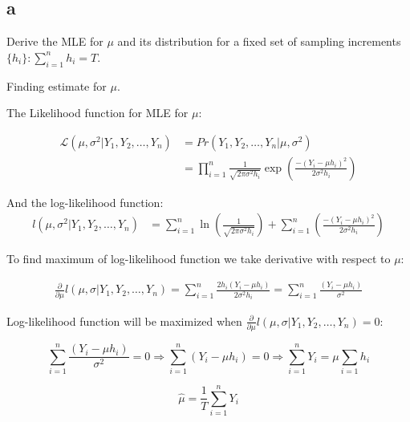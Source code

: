 \subsection{a} Derive the MLE for $\mu$ and its distribution for a fixed set of sampling increments $\{h_i\}:\sum_{i=1}^nh_i=T$.

\begin{solution} Finding estimate for $\mu$.

The Likelihood function for MLE for $\mu$:

\begin{equation}
\begin{aligned}
\mathcal{L}\left(\mu,\sigma^2|Y_1, Y_2, \ldots, Y_n\right) & = Pr(Y_1, Y_2, \ldots, Y_n|\mu, \sigma^2) \\
																										& = \prod_{i=1}^n\frac{1}{\sqrt{2\pi\sigma^2h_i}}\exp\left(\frac{-(Y_i-\mu h_i)^2}{2\sigma^2h_i}\right)
\end{aligned}
\end{equation}

And the log-likelihood function:
\begin{equation}
\label{e:loglikelihood2a}
\begin{aligned}
\mathit{l}\left(\mu,\sigma^2|Y_1, Y_2, \ldots, Y_n\right) & = \sum_{i=1}^n\ln\left(\frac{1}{\sqrt{2\pi\sigma^2h_i}}\right) + \sum_{i=1}^n\left(\frac{-(Y_i-\mu h_i)^2}{2\sigma^2h_i}\right)
\end{aligned}
\end{equation}

To find maximum of log-likelihood function we take derivative with respect to $\mu$:

\begin{equation}
\begin{aligned}
\frac{\partial}{\partial\mu}\mathit{l}\left(\mu,\sigma|Y_1, Y_2, \ldots, Y_n\right) 
								 = \sum_{i=1}^n\frac{2h_i(Y_i-\mu h_i)}{2\sigma^2h_i}
								 = \sum_{i=1}^n\frac{(Y_i-\mu h_i)}{\sigma^2}
\end{aligned}
\end{equation}

Log-likelihood function will be maximized when $\frac{\partial}{\partial\mu}\mathit{l}\left(\mu,\sigma|Y_1, Y_2, \ldots, Y_n\right) = 0$:

\begin{equation}
\sum_{i=1}^n\frac{(Y_i-\mu h_i)}{\sigma^2} = 0 \Longrightarrow
								 \sum_{i=1}^n(Y_i-\mu h_i) = 0 \Longrightarrow
								 \sum_{i=1}^nY_i = \mu\sum_{i=1} h_i
\end{equation}

\begin{equation}
\hat{\mu} = \frac{1}{T}\sum_{i=1}^nY_i
\end{equation}

\end{solution}


